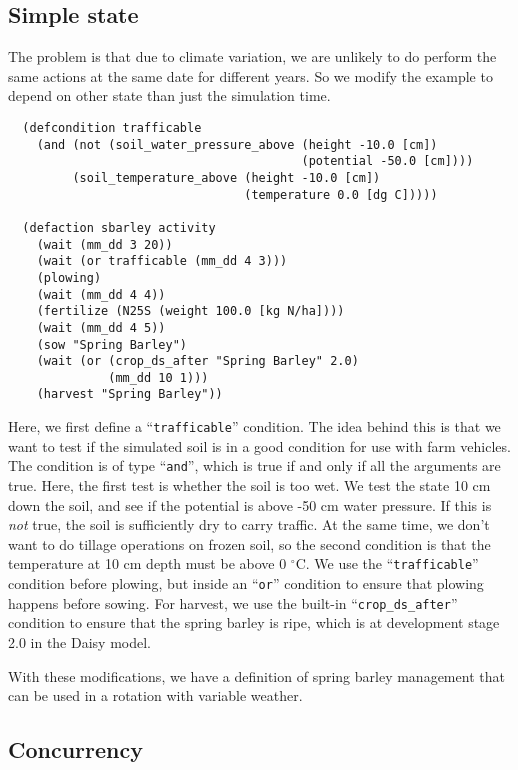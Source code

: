 \documentclass[a4paper]{article}
\newcommand{\dname}[1]{``\texttt{#1}''}
\begin{document}
\subsection{Simple state}

The problem is that due to climate variation, we are unlikely to do
perform the same actions at the same date for different years.  So we
modify the example to depend on other state than just the simulation
time. 
\begin{verbatim}
  (defcondition trafficable 
    (and (not (soil_water_pressure_above (height -10.0 [cm])
                                         (potential -50.0 [cm])))
         (soil_temperature_above (height -10.0 [cm]) 
                                 (temperature 0.0 [dg C]))))
  
  (defaction sbarley activity
    (wait (mm_dd 3 20))
    (wait (or trafficable (mm_dd 4 3)))
    (plowing)
    (wait (mm_dd 4 4))
    (fertilize (N25S (weight 100.0 [kg N/ha])))
    (wait (mm_dd 4 5))
    (sow "Spring Barley")
    (wait (or (crop_ds_after "Spring Barley" 2.0)
              (mm_dd 10 1)))
    (harvest "Spring Barley"))
\end{verbatim}
Here, we first define a \dname{trafficable} condition.  The idea
behind this is that we want to test if the simulated soil is in a good
condition for use with farm vehicles.  The condition is of type
\dname{and}, which is true if and only if all the arguments are true.
Here, the first test is whether the soil is too wet.  We test the
state 10 cm down the soil, and see if the potential is above -50 cm
water pressure.  If this is \emph{not} true, the soil is sufficiently
dry to carry traffic.  At the same time, we don't want to do tillage
operations on frozen soil, so the second condition is that the
temperature at 10 cm depth must be above 0 $^\circ$C.  We use the
\dname{trafficable} condition before plowing, but inside an \dname{or}
condition to ensure that plowing happens before sowing. For harvest,
we use the built-in \dname{crop\_ds\_after} condition to ensure that
the spring barley is ripe, which is at development stage 2.0 in the
Daisy model.

With these modifications, we have a definition of spring barley
management that can be used in a rotation with variable weather.

\subsection{Concurrency}
\end{document}
